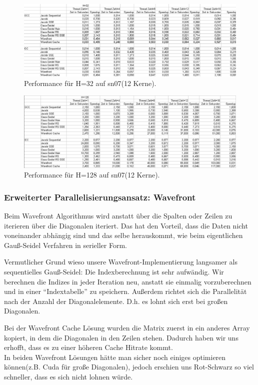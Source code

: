 \documentclass{article}
\begin{document}
\begin{figure}[htbp] 
  \centering
     \includegraphics[width=1.0\textwidth]{bilder/sn0732.png}
  \caption{Performance für H=32 auf sn07(12 Kerne).}
 
\end{figure}

\begin{figure}[htbp] 
  \centering
     \includegraphics[width=1.0\textwidth]{bilder/sn07128.png}
  \caption{Performance für H=128 auf sn07(12 Kerne).}
 
\end{figure}

\subsubsection{Erweiterter Parallelisierungsansatz: Wavefront}
Beim Wavefront Algorithmus wird anstatt über die Spalten oder Zeilen zu iterieren über die Diagonalen iteriert. Das hat den Vorteil, dass die Daten nicht voneinander abhängig sind und das selbe herauskommt, wie beim eigentlichen Gauß-Seidel Verfahren in serieller Form.

Vermutlicher Grund wieso unsere Wavefront-Implementierung langsamer als sequentielles Gauß-Seidel: Die Indexberechnung ist sehr aufwändig. Wir berechnen  die Indizes in jeder Iteration neu, anstatt sie einmalig vorzuberechnen und in einer ``Indextabelle'' zu speichern. Außerdem richtet sich die Parallelität nach der Anzahl der Diagonalelemente. D.h. es lohnt sich erst bei großen Diagonalen.

Bei der Wavefront Cache Lösung wurden die Matrix zuerst in ein anderes Array kopiert, in dem die Diagonalen in den Zeilen stehen. Dadurch haben wir uns erhofft, dass es zu einer höheren Cache Hitrate kommt. \\
In beiden Wavefront Lösungen hätte man sicher noch einiges optimieren können(z.B. Cuda für große Diagonalen), jedoch erschien uns Rot-Schwarz so viel schneller, dass es sich nicht lohnen würde.
\end{document}
